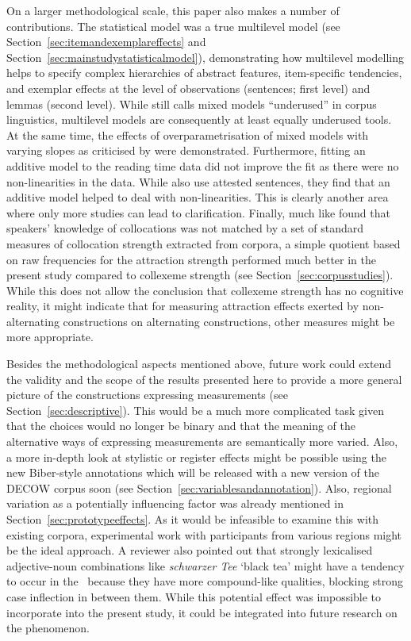 On a larger methodological scale, this paper also makes a number of contributions.
The statistical model was a true multilevel model (see Section~\ref{sec:itemandexemplareffects} and Section~\ref{sec:mainstudystatisticalmodel}), demonstrating how multilevel modelling helps to specify complex hierarchies of abstract features, item-specific tendencies, and exemplar effects at the level of observations (sentences; first level) and lemmas (second level).
While \cite{Gries2015} still calls mixed models ``underused'' in corpus linguistics, multilevel models are consequently at least equally underused tools.
At the same time, the effects of overparametrisation of mixed models with varying slopes as criticised by \cite{BatesEa2015a} were demonstrated.
Furthermore, fitting an additive model to the reading time data did not improve the fit as there were no non-linearities in the data.
While \cite{DivjakEa2016} also use attested sentences, they find that an additive model helped to deal with non-linearities.
This is clearly another area where only more studies can lead to clarification.
Finally, much like \cite{Dabrowska2014} found that speakers' knowledge of collocations was not matched by a set of standard measures of collocation strength extracted from corpora, a simple quotient based on raw frequencies for the attraction strength performed much better in the present study compared to collexeme strength (see Section~\ref{sec:corpusstudies}).
While this does not allow the conclusion that collexeme strength has no cognitive reality, it might indicate that for measuring attraction effects exerted by non-alternating constructions on alternating constructions, other measures might be more appropriate.

Besides the methodological aspects mentioned above, future work could extend the validity and the scope of the results presented here to provide a more general picture of the constructions expressing measurements (see Section~\ref{sec:descriptive}).
This would be a much more complicated task given that the choices would no longer be binary and that the meaning of the alternative ways of expressing measurements are semantically more varied.
Also, a more in-depth look at stylistic or register effects might be possible using the new Biber-style annotations which will be released with a new version of the DECOW corpus soon (see Section~\ref{sec:variablesandannotation}).
Also, regional variation as a potentially influencing factor was already mentioned in Section~\ref{sec:prototypeeffects}.
As it would be infeasible to examine this with existing corpora, experimental work with participants from various regions might be the ideal approach.
A reviewer also pointed out that strongly lexicalised adjective-noun combinations like \textit{schwarzer Tee} `black tea' might have a tendency to occur in the \NACa\ because they have more compound-like qualities, blocking strong case inflection in between them.
While this potential effect was impossible to incorporate into the present study, it could be integrated into future research on the phenomenon.

